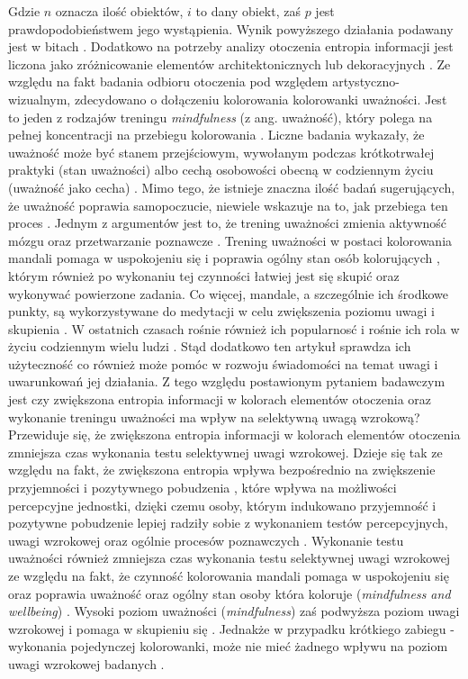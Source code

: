 \documentclass[12pt,a4paper,final,oneside,onecolumn,titlepage]{article}
\begin{document}
Gdzie $n$ oznacza ilość obiektów, $i$ to dany obiekt, zaś $p$ jest prawdopodobieństwem jego wystąpienia. Wynik powyższego działania podawany jest w bitach \citep{stamps_entropy_2004}. Dodatkowo na potrzeby analizy otoczenia entropia informacji jest liczona jako zróżnicowanie elementów architektonicznych lub dekoracyjnych \citep{stamps_entropy_2004, stamps_entropy_2002}. Ze względu na fakt badania odbioru otoczenia pod względem artystyczno-wizualnym, zdecydowano o dołączeniu kolorowania kolorowanki uważności. Jest to jeden z rodzajów treningu \textit{mindfulness} (z ang. uważność), który polega na pełnej koncentracji na przebiegu kolorowania \citep{zejmo_praktyka_2022}. Liczne badania wykazały, że uważność może być stanem przejściowym, wywołanym podczas krótkotrwałej praktyki (stan uważności) albo cechą osobowości obecną w codziennym życiu (uważność jako cecha) \citep{kiken_state_2015}. Mimo tego, że istnieje znaczna ilość badań sugerujących, że uważność poprawia samopoczucie, niewiele wskazuje na to, jak przebiega ten proces \citep{holzel_how_2011}. Jednym z argumentów jest to, że trening uważności zmienia aktywność mózgu \citep{gotink_8-week_2016} oraz przetwarzanie poznawcze \citep{zeidan_mindfulness_2010}. Trening uważności w postaci kolorowania mandali pomaga w uspokojeniu się i poprawia ogólny stan osób kolorujących \citep{carsley_effectiveness_2018, campenni_effects_2020}, którym również po wykonaniu tej czynności łatwiej jest się skupić oraz wykonywać powierzone zadania. Co więcej, mandale, a szczególnie ich środkowe punkty, są wykorzystywane do medytacji w celu zwiększenia poziomu uwagi i skupienia \citep{shankar_effectiveness_2020}. W ostatnich czasach rośnie również ich popularnosć i rośnie ich rola w życiu codziennym wielu ludzi \citep{dresler_doing_2019}. Stąd dodatkowo ten artykuł sprawdza ich użyteczność co również może pomóc w rozwoju świadomości na temat uwagi i uwarunkowań jej działania. Z tego względu postawionym pytaniem badawczym jest czy zwiększona entropia informacji w kolorach elementów otoczenia oraz wykonanie treningu uważności ma wpływ na selektywną uwagą wzrokową? Przewiduje się, że zwiększona entropia informacji w kolorach elementów otoczenia zmniejsza czas wykonania testu selektywnej uwagi wzrokowej. Dzieje się tak ze względu na fakt, że zwiększona entropia wpływa bezpośrednio na zwiększenie przyjemności i pozytywnego pobudzenia \citep{stamps_entropy_2004, stamps_entropy_2002}, które wpływa na możliwości percepcyjne jednostki, dzięki czemu osoby, którym indukowano przyjemność i pozytywne pobudzenie lepiej radziły sobie z wykonaniem testów percepcyjnych, uwagi wzrokowej oraz ogólnie procesów poznawczych \citep{mcconnell_upbeat_2011, gavazzi_pleasure_2021}. Wykonanie testu uważności również zmniejsza czas wykonania testu selektywnej uwagi wzrokowej ze względu na fakt, że czynność kolorowania mandali pomaga w uspokojeniu się oraz poprawia uważność oraz ogólny stan osoby która koloruje (\textit{mindfulness and wellbeing}) \citep{carsley_effectiveness_2018, campenni_effects_2020}. Wysoki poziom uważności (\textit{mindfulness}) zaś podwyższa poziom uwagi wzrokowej i pomaga w skupieniu się \citep{campillo_effects_2018, sumantry_meditation_2021}. Jednakże w przypadku krótkiego zabiegu - wykonania pojedynczej kolorowanki, może nie mieć żadnego wpływu na poziom uwagi wzrokowej badanych \citep{thompson_influence_2021}.
\end{document}
